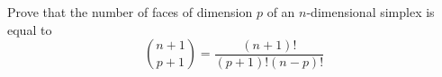 \begin{proposition}
    Prove that the number of faces of dimension \(p\) of an \(n\)-dimensional simplex is equal to
    \[\binom{n+1}{p+1}=\frac{(n+1)!}{(p+1)!(n-p)!}\]
\end{proposition}